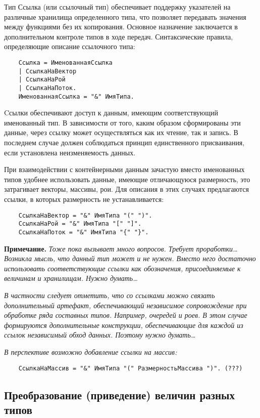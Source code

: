 {Тип Ссылка (или ссылочный тип) обеспечивает поддержку указателей на различные хранилища определенного типа, что позволяет передавать значения между функциями без их копирования. Основное назначение заключается в дополнительном контроле типов в ходе передач. Синтаксические правила, определяющие описание ссылочного типа:

\begin{verbatim}
    Ссылка = ИменованнаяСсылка
    | СсылкаНаВектор
    | СсылкаНаРой
    | СсылкаНаПоток.
    ИменованнаяСсылка = "&" ИмяТипа.
\end{verbatim}

Cсылки обеспечивают доступ к данным, имеющим соответствующий именованный тип. В зависимости от того, каким образом сформированы эти данные, через ссылку может осуществляться как их чтение, так и запись. В последнем случае должен соблюдаться принцип единственного присваивания, если установлена неизменяемость данных.

При взаимодействии с контейнерными данным зачастую вместо именованных типов удобнее использовать данные, имеющие отличающуюся размерность, это затрагивает векторы, массивы, рои. Для описания в этих случаях предлагаются ссылки, в которых размерность не устанавливается:

\begin{verbatim}
    СсылкаНаВектор = "&" ИмяТипа "(" ")".
    СсылкаНаРой = "&" ИмяТипа "[" "]".
    СсылкаНаПоток = "&" ИмяТипа "{" "}".
\end{verbatim}


\textbf{Примечание.}
\textit{Тоже пока вызывает много вопросов. Требует проработки… Возникла мысль, что данный тип может и не нужен. Вместо него достаточно использовать соответствующие ссылки как обозначения, присоединяемые к величинам и хранилищам. Нужно думать…}

\textit{В частности следует отметить, что со ссылками можно связать дополнительный артефакт, обеспечивающий независимое сопровождение при обработке ряда составных типов. Например, очередей и роев. В этом случае формируются дополнительные конструкции, обеспечивающие для каждой из ссылок независимый обход данных. Поэтому нужно думать…}

\textit{В перспективе возможно добавление ссылки на массив:}

\begin{verbatim}
    СсылкаНаМассив = "&" ИмяТипа "(" РазмерностьМассива ")". (???)
\end{verbatim}

\subsection{Преобразование (приведение) величин разных типов}

}
